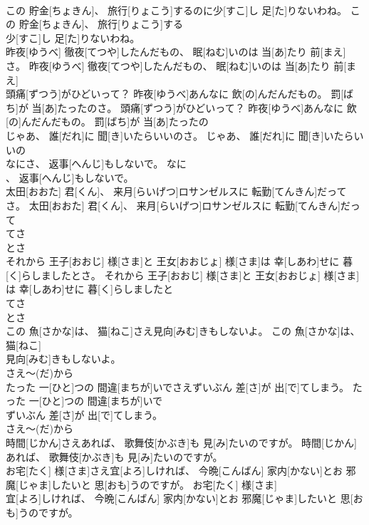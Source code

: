 \documentclass[8pt]{extreport}
\begin{document}
\begin{CJK}{UTF8}{min}
\\	この 貯金[ちょきん]、 旅行[りょこう]するのに少[すこ]し 足[た]りないわね。	この 貯金[ちょきん]、 旅行[りょこう]する
\\	少[すこ]し 足[た]りないわね。	
\\	昨夜[ゆうべ] 徹夜[てつや]したんだもの、 眠[ねむ]いのは 当[あ]たり 前[まえ]さ。	昨夜[ゆうべ] 徹夜[てつや]したんだもの、 眠[ねむ]いのは 当[あ]たり 前[まえ]
\\	頭痛[ずつう]がひどいって？ 昨夜[ゆうべ]あんなに 飲[の]んだんだもの。 罰[ばち]が 当[あ]たったのさ。	頭痛[ずつう]がひどいって？ 昨夜[ゆうべ]あんなに 飲[の]んだんだもの。 罰[ばち]が 当[あ]たったの
\\	じゃあ、 誰[だれ]に 聞[き]いたらいいのさ。	じゃあ、 誰[だれ]に 聞[き]いたらいいの
\\	なにさ、 返事[へんじ]もしないで。	なに
\\	、 返事[へんじ]もしないで。	
\\	太田[おおた] 君[くん]、 来月[らいげつ]ロサンゼルスに 転勤[てんきん]だってさ。	太田[おおた] 君[くん]、 来月[らいげつ]ロサンゼルスに 転勤[てんきん]だって
\\	てさ 
\\	とさ
\\	それから 王子[おおじ] 様[さま]と 王女[おおじょ] 様[さま]は 幸[しあわ]せに 暮[く]らしましたとさ。	それから 王子[おおじ] 様[さま]と 王女[おおじょ] 様[さま]は 幸[しあわ]せに 暮[く]らしましたと
\\	てさ 
\\	とさ
\\	この 魚[さかな]は、 猫[ねこ]さえ見向[みむ]きもしないよ。	この 魚[さかな]は、 猫[ねこ]
\\	見向[みむ]きもしないよ。	
\\	さえ～(だ)から 
\\	たった 一[ひと]つの 間違[まちが]いでさえずいぶん 差[さ]が 出[で]てしまう。	たった 一[ひと]つの 間違[まちが]いで
\\	ずいぶん 差[さ]が 出[で]てしまう。	
\\	さえ～(だ)から 
\\	時間[じかん]さえあれば、 歌舞伎[かぶき]も 見[み]たいのですが。	時間[じかん]
\\	あれば、 歌舞伎[かぶき]も 見[み]たいのですが。	
\\	お宅[たく] 様[さま]さえ宜[よろ]しければ、 今晩[こんばん] 家内[かない]とお 邪魔[じゃま]したいと 思[おも]うのですが。	お宅[たく] 様[さま]
\\	宜[よろ]しければ、 今晩[こんばん] 家内[かない]とお 邪魔[じゃま]したいと 思[おも]うのですが。	

\end{CJK}
\end{document}

